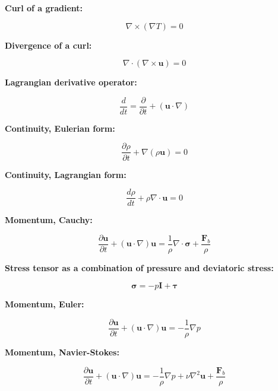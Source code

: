 \documentclass[12pt]{article}
\numberwithin{equation}{section}
\numberwithin{figure}{section}
\numberwithin{table}{section}
\begin{document}
\textbf{Curl of a gradient:}

\begin{equation}
  \nabla \times (\nabla T) = 0
\end{equation}

\textbf{Divergence of a curl:}

\begin{equation}
  \nabla \cdot (\nabla \times \mathbf{u}) = 0
\end{equation}

\textbf{Lagrangian derivative operator:}
 
\begin{equation}
  \frac{d}{dt} = \frac{\partial}{\partial t} + (\mathbf{u} \cdot \nabla)
\end{equation}

\textbf{Continuity, Eulerian form:}

\begin{equation}
  \frac{\partial \rho}{\partial t} + \nabla (\rho \mathbf{u}) = 0
\end{equation}

\textbf{Continuity, Lagrangian form:}

\begin{equation}
  \frac{d\rho}{dt} + \rho \nabla \cdot \mathbf{u} = 0
\end{equation}

\textbf{Momentum, Cauchy:}

\begin{equation}
  \frac{\partial \mathbf{u}}{\partial t} + (\mathbf{u} \cdot \nabla) \mathbf{u} =
  \frac{1}{\rho} \nabla \cdot \boldsymbol{\sigma} + \frac{\mathbf{F}_b}{\rho}
\end{equation}

\textbf{Stress tensor as a combination of pressure and deviatoric stress:}

\begin{equation}
  \boldsymbol{\sigma} = -p \mathbf{I} + \boldsymbol{\tau}
\end{equation}

\textbf{Momentum, Euler:}

\begin{equation}
  \frac{\partial \mathbf{u}}{\partial t} + (\mathbf{u} \cdot \nabla) \mathbf{u} =
  - \frac{1}{\rho} \nabla p
\end{equation}

\textbf{Momentum, Navier-Stokes:}

\begin{equation}
  \frac{\partial \mathbf{u}}{\partial t} + (\mathbf{u} \cdot \nabla) \mathbf{u} =
  - \frac{1}{\rho} \nabla p + \nu \nabla^2 \mathbf{u} + \frac{\mathbf{F}_b}{\rho}
\end{equation}
\end{document}

